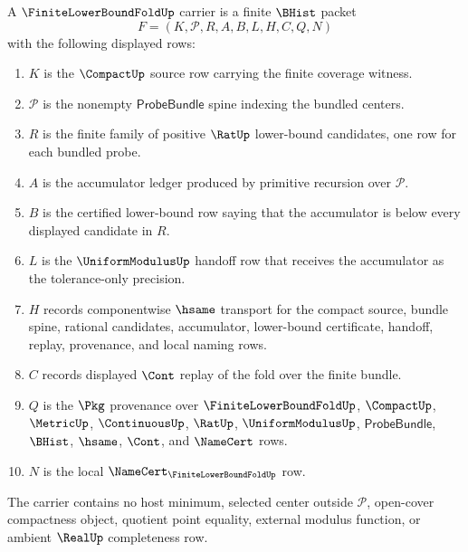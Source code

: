 \begin{definition}
\label{def:finite-lower-bound-fold-carrier}
A $\FiniteLowerBoundFoldUp$ carrier is a finite $\BHist$ packet
$$
F=(K,\mathcal{P},R,A,B,L,H,C,Q,N)
$$
with the following displayed rows:
\begin{enumerate}
\item $K$ is the $\CompactUp$ source row carrying the finite coverage witness.
\item $\mathcal{P}$ is the nonempty $\mathsf{ProbeBundle}$ spine indexing the bundled centers.
\item $R$ is the finite family of positive $\RatUp$ lower-bound candidates, one row for each bundled probe.
\item $A$ is the accumulator ledger produced by primitive recursion over $\mathcal{P}$.
\item $B$ is the certified lower-bound row saying that the accumulator is below every displayed candidate in $R$.
\item $L$ is the $\UniformModulusUp$ handoff row that receives the accumulator as the tolerance-only precision.
\item $H$ records componentwise $\hsame$ transport for the compact source, bundle spine, rational candidates, accumulator, lower-bound certificate, handoff, replay, provenance, and local naming rows.
\item $C$ records displayed $\Cont$ replay of the fold over the finite bundle.
\item $Q$ is the $\Pkg$ provenance over $\FiniteLowerBoundFoldUp$, $\CompactUp$, $\MetricUp$, $\ContinuousUp$, $\RatUp$, $\UniformModulusUp$, $\mathsf{ProbeBundle}$, $\BHist$, $\hsame$, $\Cont$, and $\NameCert$ rows.
\item $N$ is the local $\NameCert_{\FiniteLowerBoundFoldUp}$ row.
\end{enumerate}
The carrier contains no host minimum, selected center outside $\mathcal{P}$, open-cover compactness object, quotient point equality, external modulus function, or ambient $\RealUp$ completeness row.
\end{definition}

